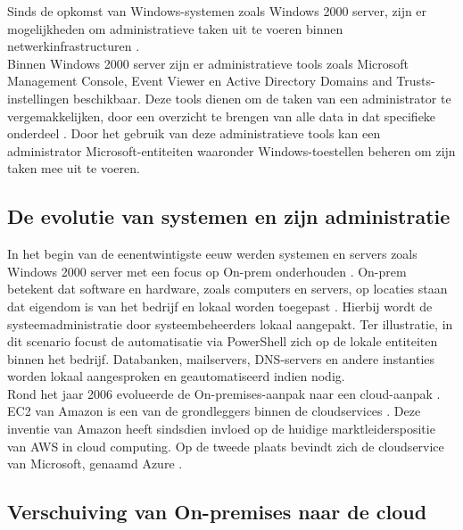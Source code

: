 
Sinds de opkomst van Windows-systemen zoals Windows 2000 server, zijn er mogelijkheden om administratieve taken uit te voeren binnen netwerkinfrastructuren \autocite{Tulloch2001}. \\

Binnen Windows 2000 server zijn er administratieve tools zoals Microsoft Management Console, Event Viewer en Active Directory Domains and Trusts-instellingen beschikbaar. Deze tools dienen om de taken van een administrator te vergemakkelijken, door een overzicht te brengen van alle data in dat specifieke onderdeel \autocite{Sibisi2022}. Door het gebruik van deze administratieve tools kan een administrator Microsoft-entiteiten waaronder Windows-toestellen beheren om zijn taken mee uit te voeren. 

\subsection{De evolutie van systemen en zijn administratie}


In het begin van de eenentwintigste eeuw werden systemen en servers zoals Windows 2000 server met een focus op \ac{On-prem} onderhouden \autocite{Microsoft2022a}. \ac{On-prem} betekent dat software en hardware, zoals computers en servers, op locaties staan dat eigendom is van het bedrijf en lokaal worden toegepast \autocite{Gastermann2015}. Hierbij wordt de systeemadministratie door systeembeheerders lokaal aangepakt. Ter illustratie, in dit scenario focust de automatisatie via PowerShell zich op de lokale entiteiten binnen het bedrijf. Databanken, mailservers, \ac{DNS}-servers en andere instanties worden lokaal aangesproken en geautomatiseerd indien nodig. \\

Rond het jaar 2006 evolueerde de On-premises-aanpak naar een cloud-aanpak \autocite{Hayes2008}. \ac{EC2} van Amazon is een van de grondleggers binnen de cloudservices \autocite{Qian2009}. Deze inventie van Amazon heeft sindsdien invloed op de huidige marktleiderspositie van AWS in cloud computing. Op de tweede plaats bevindt zich de cloudservice van Microsoft, genaamd Azure \autocite{Vailshery2022}.



\subsection{Verschuiving van On-premises naar de cloud}

